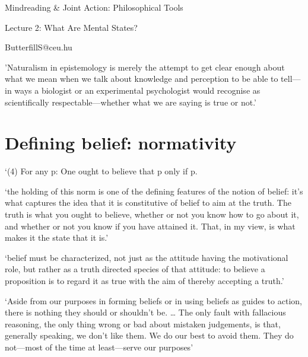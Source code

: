 \documentclass[11pt]{extarticle}
\date{}
\begin{document}
\begin{multicols}{3}

\setlength\footnotesep{1em}









\begin{center}
{\Large
Mindreading \& Joint Action: Philosophical Tools}

Lecture 2: What Are Mental States?


ButterfillS@ceu.hu
\end{center}

'Naturalism in epistemology is merely the attempt to get clear enough about what we mean when we talk about knowledge and perception to be able to tell—in ways a biologist or an experimental psychologist would recognise as scientifically respectable—whether what we are saying is true or not.'\citep%
{Dretske:2000ky}


\section{Defining belief: normativity}
‘(4) For any p: One ought to believe that p only if p.

‘the holding of this norm is one of the defining features of the notion of belief: it’s what captures the idea that it is constitutive of belief to aim at the truth. The truth is what you ought to believe, whether or not you know how to go about it, and whether or not you know if you have attained it. That, in my view, is what makes it the state that it is.’\citep{boghossian:2003_normativity} %

`belief must be characterized, not just as the attitude having the motivational role, but rather as a truth directed species of that attitude: to believe a proposition is to regard it as true with the aim of thereby accepting a truth.'\citep{Velleman:2000fq} %

‘Aside from our purposes in forming beliefs or in using beliefs as guides to action, there is nothing they should or shouldn’t be.  …  The only fault with fallacious reasoning, the only thing wrong or bad about mistaken judgements, is that, generally speaking, we don’t like them.  We do our best to avoid them.  They do not—most of the time at least—serve our purposes’\citep{Dretske:2000ky} %


\end{multicols}
\end{document}
